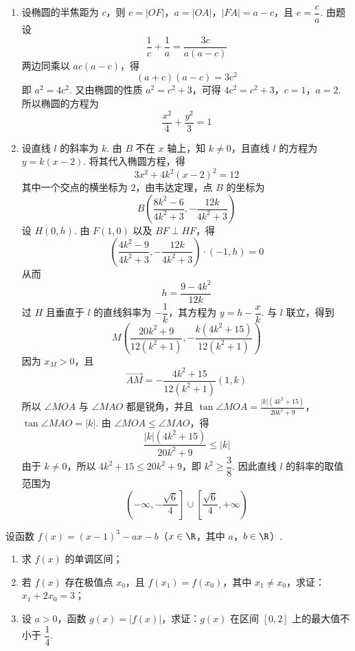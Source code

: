 \begin{solution}
\begin{enumerate}
\item 设椭圆的半焦距为 \(c\)，则 \(c=\lvert OF\rvert\)，\(a=\lvert OA\rvert\)，\(\lvert FA\rvert=a-c\)，且 \(e=\dfrac ca\). 由题设
\[
\frac1c+\frac1a=\frac{3c}{a(a-c)}
\]
两边同乘以 \(ac(a-c)\)，得
\[
(a+c)(a-c)=3c^2
\]
即 \(a^2=4c^2\). 又由椭圆的性质 \(a^2=c^2+3\)，可得
\(4c^2=c^2+3\)，\(c=1\)，\(a=2\).
所以椭圆的方程为
\[
\frac{x^2}{4}+\frac{y^2}{3}=1
\]

\item 设直线 \(l\) 的斜率为 \(k\). 由 \(B\) 不在 \(x\) 轴上，知 \(k\neq0\)，且直线 \(l\) 的方程为 \(y=k(x-2)\).
将其代入椭圆方程，得
\[
3x^2+4k^2(x-2)^2=12
\]
其中一个交点的横坐标为 \(2\)，由韦达定理，点 \(B\) 的坐标为
\[
B\left(\frac{8k^2-6}{4k^2+3},-\frac{12k}{4k^2+3}\right)
\]
设 \(H(0,h)\). 由 \(F(1,0)\) 以及 \(BF\perp HF\)，得
\[
\left(\frac{4k^2-9}{4k^2+3},-\frac{12k}{4k^2+3}\right)
\cdot(-1,h)=0
\]
从而
\[
h=\frac{9-4k^2}{12k}
\]
过 \(H\) 且垂直于 \(l\) 的直线斜率为 \(-\dfrac1k\)，其方程为
\(y=h-\dfrac{x}{k}\). 与 \(l\) 联立，得到
\[
M\left(\frac{20k^2+9}{12(k^2+1)},-\frac{k(4k^2+15)}{12(k^2+1)}\right)
\]
因为 \(x_M>0\)，且
\[
\overrightarrow{AM}=-\frac{4k^2+15}{12(k^2+1)}(1,k)
\]
所以 \(\angle MOA\) 与 \(\angle MAO\) 都是锐角，并且
\(\tan\angle MOA=\frac{|k|(4k^2+15)}{20k^2+9}\)，\(\tan\angle MAO=|k|\).
由 \(\angle MOA\leqslant\angle MAO\)，得
\[
\frac{|k|(4k^2+15)}{20k^2+9}\leqslant|k|
\]
由于 \(k\neq0\)，所以 \(4k^2+15\leqslant20k^2+9\)，即 \(k^2\geqslant\dfrac38\).
因此直线 \(l\) 的斜率的取值范围为
\[
\left(-\infty,-\frac{\sqrt6}{4}\right]\cup\left[\frac{\sqrt6}{4},+\infty\right)
\]
\end{enumerate}
\end{solution}

\begin{problem}
设函数 \(f(x)=(x-1)^3-ax-b\)（\(x\in\R\)，其中 \(a\)，\(b\in\R\)）.

\begin{enumerate}
\item 求 \(f(x)\) 的单调区间；
\item 若 \(f(x)\) 存在极值点 \(x_0\)，且 \(f(x_1)=f(x_0)\)，其中 \(x_1\neq x_0\)，求证：\(x_1+2x_0=3\)；
\item 设 \(a>0\)，函数 \(g(x)=\lvert f(x)\rvert\)，求证：\(g(x)\) 在区间 \([0,2]\) 上的最大值不小于 \(\dfrac14\).
\end{enumerate}
\end{problem}

